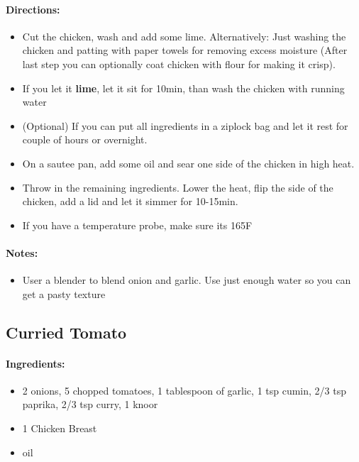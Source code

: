 \documentclass{article}
\begin{document}
\paragraph{Directions:}
\begin{itemize}
    \item Cut the chicken, wash and add some lime. Alternatively: Just washing the chicken and patting with paper towels for removing excess moisture (After last step you can optionally coat chicken with flour for making it crisp).
    \item If you let it \textbf{lime}, let it sit for 10min, than wash the chicken with running water
    \item (Optional) If you can put all ingredients in a ziplock bag and let it rest for couple of hours or overnight.
    \item On a sautee pan, add some oil and sear one side of the chicken in high heat.
    \item Throw in the remaining ingredients. Lower the heat, flip the side of the chicken, add a lid and let it simmer for 10-15min.
    \item If you have a temperature probe, make sure its 165F
\end{itemize}

\paragraph{Notes:}
\begin{itemize}
    \item User a blender to blend onion and garlic. Use just enough water so you can get a pasty texture
\end{itemize}

\subsection{Curried Tomato}

\paragraph{Ingredients:}
\begin{itemize}
    \item 2 onions, 5 chopped tomatoes, 1 tablespoon of garlic, 1 tsp cumin, 2/3 tsp paprika, 2/3 tsp curry, 1 knoor
    \item 1 Chicken Breast
    \item oil
\end{itemize}
\end{document}
